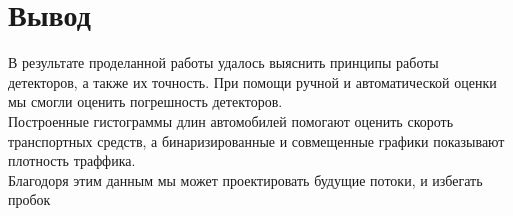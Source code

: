 \documentclass[a4paper,12pt]{article}
\begin{document}
\newpage
\section*{Вывод}
В результате проделанной работы удалось выяснить принципы работы детекторов, а также их точность.
При помощи ручной и автоматической оценки мы смогли оценить погрешность детекторов.\\
Построенные гистограммы длин автомобилей помогают оценить скороть транспортных средств,
а бинаризированные и совмещенные графики показывают плотность траффика.\\
Благодоря этим данным мы может проектировать будущие потоки, и избегать пробок
\newpage
\end{document}
